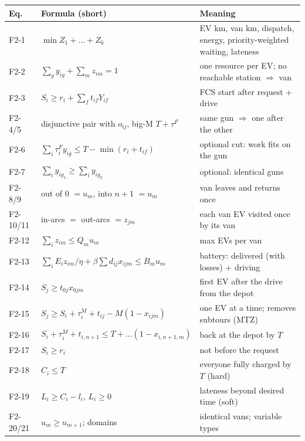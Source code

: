 \documentclass[11pt,a4paper]{article}
\begin{document}
\begin{center}
\renewcommand{\arraystretch}{1.3}
\small
\begin{tabularx}{\textwidth}{@{}l>{\raggedright\arraybackslash}p{6.6cm}X@{}}
\toprule
\textbf{Eq.} & \textbf{Formula (short)} & \textbf{Meaning} \\
\midrule
F2-1 & $\min Z_1+\dots+Z_6$ & EV km, van km, dispatch, energy, priority-weighted waiting, lateness \\
F2-2 & $\sum_g y_{ig}+\sum_m z_{im}=1$ & one resource per EV; no reachable station $\Rightarrow$ van \\
F2-3 & $S_i\ge r_i+\sum_f t_{if}Y_{if}$ & FCS start after request + drive \\
F2-4/5 & disjunctive pair with $o_{ij}$, big-M $T+\tau^F$ & same gun $\Rightarrow$ one after the other \\
F2-6 & $\sum_i\tau^F_iy_{ig}\le T-\min(r_i+t_{if})$ & optional cut: work fits on the gun \\
F2-7 & $\sum_iy_{ig_1}\ge\sum_iy_{ig_2}$ & optional: identical guns \\
F2-8/9 & out of 0 $=u_m$, into $n{+}1$ $=u_m$ & van leaves and returns once \\
F2-10/11 & in-arcs $=$ out-arcs $=z_{jm}$ & each van EV visited once by its van \\
F2-12 & $\sum_iz_{im}\le Q_mu_m$ & max EVs per van \\
F2-13 & $\sum_iE_iz_{im}/\eta+\beta\sum d_{ij}x_{ijm}\le B_mu_m$ & battery: delivered (with losses) + driving \\
F2-14 & $S_j\ge t_{0j}x_{0jm}$ & first EV after the drive from the depot \\
F2-15 & $S_j\ge S_i+\tau^M_i+t_{ij}-M(1-x_{ijm})$ & one EV at a time; removes subtours (MTZ) \\
F2-16 & $S_i+\tau^M_i+t_{i,n+1}\le T+\dots(1-x_{i,n+1,m})$ & back at the depot by $T$ \\
F2-17 & $S_i\ge r_i$ & not before the request \\
F2-18 & $C_i\le T$ & everyone fully charged by $T$ (hard) \\
F2-19 & $L_i\ge C_i-l_i$, $L_i\ge0$ & lateness beyond desired time (soft) \\
F2-20/21 & $u_m\ge u_{m+1}$; domains & identical vans; variable types \\
\bottomrule
\end{tabularx}
\end{center}
\end{document}
